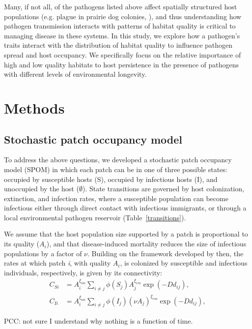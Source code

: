 \documentclass{article}
\begin{document}
Many, if not all, of the pathogens listed above affect spatially structured host populations (e.g. plague in prairie dog colonies, \cite{George2013}), and thus understanding how pathogen transmission interacts with patterns of habitat quality is critical to managing disease in these systems.  In this study, we explore how a pathogen's traits interact with the distribution of habitat quality to influence pathogen spread and host occupancy.  We specifically focus on the relative importance of high and low quality habitats to host persistence in the presence of pathogens with different levels of environmental longevity. 

\section{Methods}
\label{methods}

\subsection{Stochastic patch occupancy model}


To address the above questions, we developed a stochastic patch occupancy model (SPOM) in which each patch can be in one of three possible states: occupied by susceptible hosts (S), occupied by infectious hosts (I), and unoccupied by the host ($\emptyset$).  State transitions are governed by host colonization, extinction, and infection rates, where a susceptible population can become infectious either through direct contact with infectious immigrants, or through a local environmental pathogen reservoir (Table~\ref{transitions}).

We assume that the host population size supported by a patch is proportional to its quality ($A_i$), and that disease-induced mortality reduces the size of infectious populations by a factor of $\nu$.  Building on the framework developed by \cite{Hanski2003} then, the rates at which patch \emph{i}, with quality $A_i$, is colonized by susceptible and infectious individuals, respectively, is given by its connectivity:
\begin{align}
C_{Si} &= A_i^{\xi_{im}} \sum_{i\neq j }\phi(S_j)A_j^{\xi_{em}}\exp(-D d_{ij}),\\
C_{Ii} &= A_i^{\xi_{im}} \sum_{i\neq j }\phi(I_j)(\nu A_j) ^{\xi_{em}}\exp(-D d_{ij}),
\label{connectivity}
\end{align}

PCC: not sure I understand why nothing is a function of time.
\end{document}
